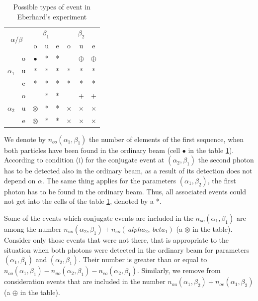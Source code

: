 \documentclass[11pt]{article}
\begin{document}
\begin{table}
\centering
\begin{tabular}{|c|c|c|c|c|c|c|c|}
\hline 
\multicolumn{2}{|c|}{\multirow{2}{*}{$\alpha / \beta$}}  & \multicolumn{3}{c|}{$\beta_1$} & \multicolumn{3}{c|}{$\beta_2$} \\ 
\cline{3-8}
\multicolumn{2}{|c|}{}  & o & u & e & o & u & e \\ 
\hline 
\multirow{3}{*}{$\alpha_1$} & o & $\bullet$ & * & * &  & $\oplus$ & $\oplus$ \\ 
\cline{2-8}
 & u & * & * & * & * & * & * \\ 
\cline{2-8}
 & e & * & * & * & * & * & * \\ 
\hline 
\multirow{3}{*}{$\alpha_2$} & o &  & * & * &  & + & + \\ 
\cline{2-8}
 & u & $\otimes$ & * & * & $\times$ & $\times$ & $\times$ \\ 
\cline{2-8}
 & e & $\otimes$ & * & * & $\times$ & $\times$ & $\times$ \\ 
\hline 
\end{tabular} 
\caption{Possible types of event in Eberhard's experiment}
\label{tab:Eberhard_table}
\end{table}

We denote by $ n_{oo} (\alpha_1, \beta_1) $ the number of elements of the first sequence, when both particles have been found in the ordinary beam (cell $ \bullet $ in the table \ref{tab:Eberhard_table}). According to condition (i) for the conjugate event at $ (\alpha_2, \beta_1) $ the second photon has to be detected also in the ordinary beam, as a result of its detection does not depend on $ \alpha $. The same thing applies for the parameters $ (\alpha_1, \beta_2) $, the first photon has to be found in the ordinary beam. Thus, all associated events could not get into the cells of the table \ref{tab:Eberhard_table}, denoted by a *.

Some of the events which conjugate events are included in the $ n_{oo} (\alpha_1, \beta_1) $ are among the number $ n_{uo} (\alpha_2, \beta_1) + n_ {eo} (\ alpha_2, \ beta_1) $ (a $ \otimes $ in the table). Consider only those events that were not there, that is appropriate to the situation when both photons were detected in the ordinary beam for parameters $ (\alpha_1, \beta_1) $ and $ (\alpha_2, \beta_1) $. Their number is greater than or equal to $ n_{oo} (\alpha_1, \beta_1) - n_{uo} (\alpha_2, \beta_1) - n_{eo} (\alpha_2, \beta_1) $. Similarly, we remove from consideration events that are included in the number $ n_{ou} (\alpha_1, \beta_2) + n_{oe} (\alpha_1, \beta_2) $ (a $ \oplus $ in the table).
\end{document}
